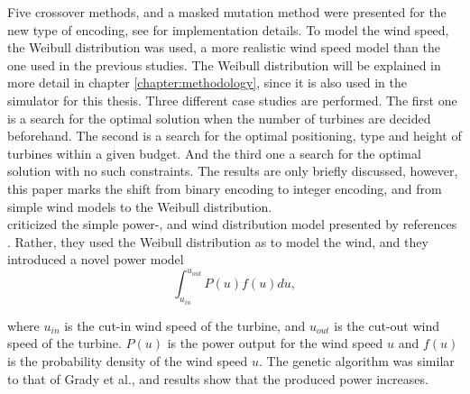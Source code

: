 \noindent Five crossover methods, and a masked mutation method were presented for the new type of encoding, see \cite{Mora} for implementation details. To model the wind speed, the Weibull distribution was used, a more realistic wind speed model than the one used in the previous studies. The Weibull distribution will be explained in more detail in chapter \ref{chapter:methodology}, since it is also used in the simulator for this thesis. Three different case studies are performed. The first one is a search for the optimal solution when the number of turbines are decided beforehand. The second is a search for the optimal positioning, type and height of turbines within a given budget. And the third one a search for the optimal solution with no such constraints. The results are only briefly discussed, however, this paper marks the shift from binary encoding to integer encoding, and from simple wind models to the Weibull distribution.\\


\noindent \cite{Wan} criticized the simple power-, and wind distribution model presented by references \citep{Mosetti, Grady}. Rather, they used the Weibull distribution as \citep{Mora} to model the wind, and they introduced a novel power model \\


\begin{equation}
\label{Power Model (Wan)}
\int_{u_{in}}^{u_{out}} P(u)f(u) du,
\end{equation}


\noindent where $u_{in}$ is the cut-in wind speed of the turbine, and $u_{out}$ is the cut-out wind speed of the turbine. $P(u)$ is the power output for the wind speed $u$ and $f(u)$ is the probability density of the wind speed $u$. The genetic algorithm was similar to that of Grady et al., and results show that the produced power increases.\\



